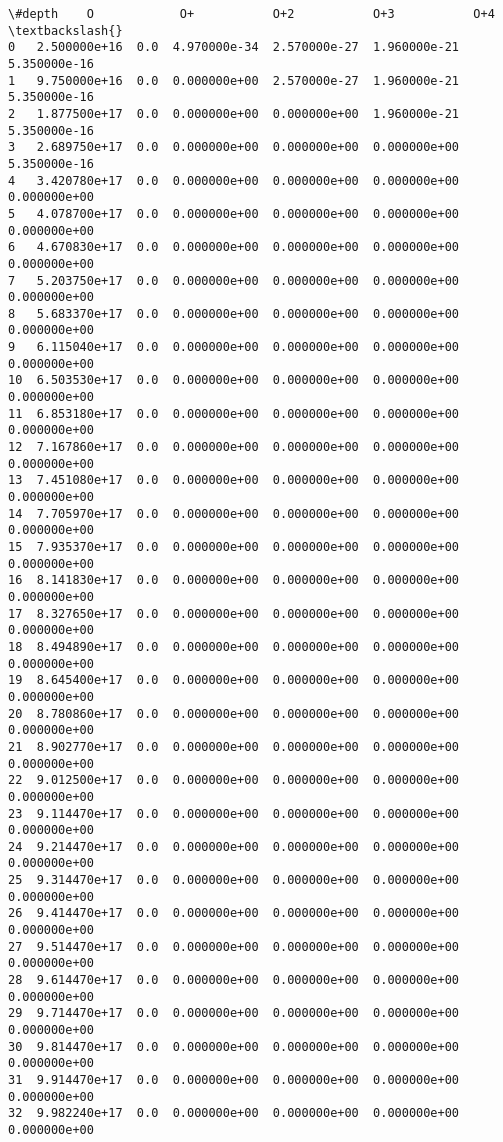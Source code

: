 \documentclass[11pt]{article}
\makeatletter
\newcommand{\boxspacing}{\kern\kvtcb@left@rule\kern\kvtcb@boxsep}
\newcommand{\prompt}[4]{
        \ttfamily\llap{{\color{#2}[#3]:\hspace{3pt}#4}}\vspace{-\baselineskip}
    }
\makeatother
\begin{document}
            \begin{tcolorbox}[breakable, size=fbox, boxrule=.5pt, pad at break*=1mm, opacityfill=0]
\prompt{Out}{outcolor}{214}{\boxspacing}
\begin{Verbatim}[commandchars=\\\{\}]
          \#depth    O            O+           O+2           O+3           O+4  \textbackslash{}
0   2.500000e+16  0.0  4.970000e-34  2.570000e-27  1.960000e-21  5.350000e-16
1   9.750000e+16  0.0  0.000000e+00  2.570000e-27  1.960000e-21  5.350000e-16
2   1.877500e+17  0.0  0.000000e+00  0.000000e+00  1.960000e-21  5.350000e-16
3   2.689750e+17  0.0  0.000000e+00  0.000000e+00  0.000000e+00  5.350000e-16
4   3.420780e+17  0.0  0.000000e+00  0.000000e+00  0.000000e+00  0.000000e+00
5   4.078700e+17  0.0  0.000000e+00  0.000000e+00  0.000000e+00  0.000000e+00
6   4.670830e+17  0.0  0.000000e+00  0.000000e+00  0.000000e+00  0.000000e+00
7   5.203750e+17  0.0  0.000000e+00  0.000000e+00  0.000000e+00  0.000000e+00
8   5.683370e+17  0.0  0.000000e+00  0.000000e+00  0.000000e+00  0.000000e+00
9   6.115040e+17  0.0  0.000000e+00  0.000000e+00  0.000000e+00  0.000000e+00
10  6.503530e+17  0.0  0.000000e+00  0.000000e+00  0.000000e+00  0.000000e+00
11  6.853180e+17  0.0  0.000000e+00  0.000000e+00  0.000000e+00  0.000000e+00
12  7.167860e+17  0.0  0.000000e+00  0.000000e+00  0.000000e+00  0.000000e+00
13  7.451080e+17  0.0  0.000000e+00  0.000000e+00  0.000000e+00  0.000000e+00
14  7.705970e+17  0.0  0.000000e+00  0.000000e+00  0.000000e+00  0.000000e+00
15  7.935370e+17  0.0  0.000000e+00  0.000000e+00  0.000000e+00  0.000000e+00
16  8.141830e+17  0.0  0.000000e+00  0.000000e+00  0.000000e+00  0.000000e+00
17  8.327650e+17  0.0  0.000000e+00  0.000000e+00  0.000000e+00  0.000000e+00
18  8.494890e+17  0.0  0.000000e+00  0.000000e+00  0.000000e+00  0.000000e+00
19  8.645400e+17  0.0  0.000000e+00  0.000000e+00  0.000000e+00  0.000000e+00
20  8.780860e+17  0.0  0.000000e+00  0.000000e+00  0.000000e+00  0.000000e+00
21  8.902770e+17  0.0  0.000000e+00  0.000000e+00  0.000000e+00  0.000000e+00
22  9.012500e+17  0.0  0.000000e+00  0.000000e+00  0.000000e+00  0.000000e+00
23  9.114470e+17  0.0  0.000000e+00  0.000000e+00  0.000000e+00  0.000000e+00
24  9.214470e+17  0.0  0.000000e+00  0.000000e+00  0.000000e+00  0.000000e+00
25  9.314470e+17  0.0  0.000000e+00  0.000000e+00  0.000000e+00  0.000000e+00
26  9.414470e+17  0.0  0.000000e+00  0.000000e+00  0.000000e+00  0.000000e+00
27  9.514470e+17  0.0  0.000000e+00  0.000000e+00  0.000000e+00  0.000000e+00
28  9.614470e+17  0.0  0.000000e+00  0.000000e+00  0.000000e+00  0.000000e+00
29  9.714470e+17  0.0  0.000000e+00  0.000000e+00  0.000000e+00  0.000000e+00
30  9.814470e+17  0.0  0.000000e+00  0.000000e+00  0.000000e+00  0.000000e+00
31  9.914470e+17  0.0  0.000000e+00  0.000000e+00  0.000000e+00  0.000000e+00
32  9.982240e+17  0.0  0.000000e+00  0.000000e+00  0.000000e+00  0.000000e+00


\end{Verbatim}
\end{tcolorbox}
\end{document}
